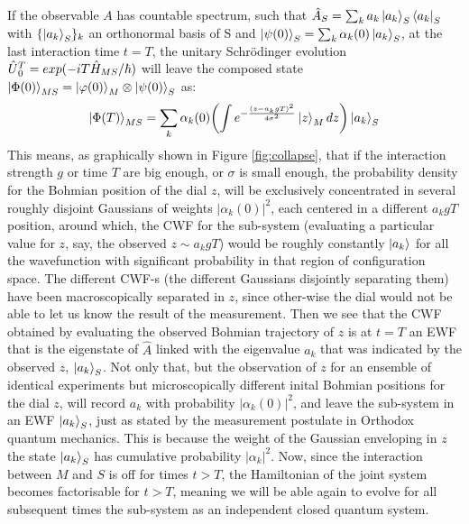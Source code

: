 \documentclass[11pt, a4paper]{article} %
\begin{document}
If the observable $A$ has countable spectrum, such that $\hat{A}_S=\sum_k a_k \ket{a_k}_S\bra{a_k}_S$ with $\{\ket{a_k}_S\}_k$ an orthonormal basis of S and $\ket{\psi(0)}_S=\sum_k \alpha_k(0)\ket{a_k}_S$, at the last interaction time $t=T$, the unitary Schrödinger evolution $\hat{U} \null_{0}^T=exp(-iT \hat{H}_{MS}/\hbar)$ will leave the composed state $\ket{\Phi(0)}_{MS}=\ket{\varphi(0)}_M\otimes\ket{\psi(0)}_S$ as:
\begin{equation}
\ket{\Phi(T)}_{MS}=\sum_k \alpha_k(0)\qty(\int e^{-\frac{(z-a_kgT)^2}{4\sigma^2}}\ket{z}_M dz )\ket{a_k}_S
\end{equation}
This means, as graphically shown in Figure \ref{fig:collapse}, that if the interaction strength $g$ or time $T$ are big enough, or $\sigma$ is small enough, the probability density for the Bohmian position of the dial $z$, will be exclusively concentrated in several roughly disjoint Gaussians of weights $|\alpha_k(0)|^2$, each centered in a different $a_k gT$ position, around which, the CWF for the sub-system (evaluating a particular value for $z$, say, the observed $z\sim a_k gT$) would be roughly constantly $\ket{a_k}$ for all the wavefunction with significant probability in that region of configuration space. The different CWF-s (the different Gaussians disjointly separating them) have been macroscopically separated in $z$, since other-wise the dial would not be able to let us know the result of the measurement. Then we see that the CWF obtained by evaluating the observed Bohmian trajectory of $z$ is at $t=T$ an EWF that is the eigenstate of $\hat{A}$ linked with the eigenvalue $a_k$ that was indicated by the observed $z$, $\ket{a_k}_S$. Not only that, but the observation of $z$ for an ensemble of identical experiments but microscopically different inital Bohmian positions for the dial $z$, will record $a_k$ with probability $|\alpha_k(0)|^2$, and leave the sub-system in an EWF $\ket{a_k}_S$, just as stated by the measurement postulate in Orthodox quantum mechanics. This is because the weight of the Gaussian enveloping in $z$ the state $\ket{a_k}_S$ has cumulative probability $|\alpha_k|^2$. Now, since the interaction between $M$ and $S$ is off for times $t>T$, the Hamiltonian of the joint system becomes factorisable for $t>T$, meaning we will be able again to evolve for all subsequent times the sub-system as an independent closed quantum system. 
\end{document}
